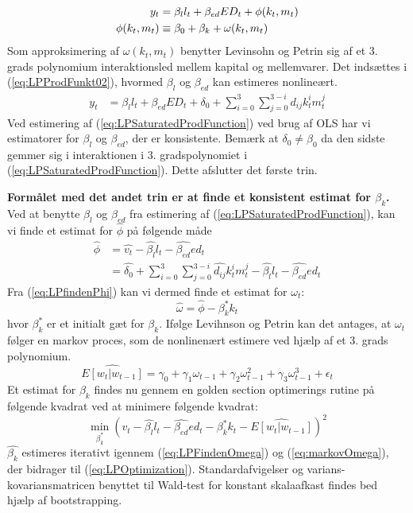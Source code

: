 \begin{align}
	y_t &= \beta_l l_t + \beta_{ed} ED_t + \phi ( k_t , m_t)
	\label{eq:LPProdFunkt02}\\
	\phi ( k_t , m_t) &\equiv \beta_0 + \beta_k + \omega (k_t , m_t) \notag
\end{align}
Som approksimering af $\omega ( k_t , m_t)$ benytter Levinsohn og Petrin sig af et 3. grads polynomium interaktionsled mellem kapital og mellemvarer. Det indsættes i (\ref{eq:LPProdFunkt02}), hvormed $\beta_l$ og $\beta_{ed}$ kan estimeres nonlineært.
\begin{align}
	y_t &= \beta_l l_t + \beta_{ed} ED_t + \delta_0 + \sum_{i=0}^{3} \sum_{j=0}^{3-i} d_{ij} k_t^i m_t^j 
	\label{eq:LPSaturatedProdFunction}
\end{align}
Ved estimering af (\ref{eq:LPSaturatedProdFunction}) ved brug af OLS har vi estimatorer for $\beta_l$ og $\beta_{ed}$, der er konsistente. Bemærk at $\delta_0 \neq \beta_0$ da den sidste gemmer sig i interaktionen i 3. gradspolynomiet i (\ref{eq:LPSaturatedProdFunction}). Dette afslutter det første trin.

\textbf{Formålet med det andet trin er at finde et konsistent estimat for $\beta_k$.} 
Ved at benytte $\beta_l$ og $\beta_{ed}$ fra estimering af (\ref{eq:LPSaturatedProdFunction}), kan vi finde et estimat for $\hat{\phi}$ på følgende måde
\begin{align}
	\hat{\phi} &= \hat{v_t} - \hat{\beta_l} l_t - \hat{\beta_{ed}} ed_t \\
	&= \hat{\delta_0} + \sum_{i=0}^{3} \sum_{j=0}^{3-i} \hat{d_{ij}} k_t^i m_t^j - \hat{\beta_l} l_t - \hat{\beta_{ed}} ed_t 
	\label{eq:LPfindenPhi}
\end{align}
Fra (\ref{eq:LPfindenPhi}) kan vi dermed finde et estimat for $\omega_t$:
\begin{equation}
	\hat{\omega} = \hat{\phi} - \beta^*_k k_t
	\label{eq:LPFindenOmega}
\end{equation}
hvor $\beta_k^*$ er et initialt gæt for $\beta_k$. Ifølge Levihnson og Petrin kan det antages, at $\omega_t$ følger en markov proces, som de nonlinenært estimere ved hjælp af et 3. grads polynomium.
\begin{equation}
 	\hat{E[w_t | w_{t-1}]} = \gamma_0 + \gamma_1 \omega_{t-1} + \gamma_2 \omega^2_{t-1} + \gamma_3 \omega^3_{t-1} + \epsilon_t
 	\label{eq:markovOmega}
 \end{equation} 
Et estimat for $\beta_k$ findes nu gennem en golden section optimerings rutine på følgende kvadrat ved at minimere følgende kvadrat:
\begin{equation}
	\min_{\beta^*_k} 
	\left( 
		v_t - \hat{\beta_l} l_t - \hat{\beta_{ed}} ed_t 
		- \beta^*_k k_t - \hat{E[w_t | w_{t-1}]} 
	\right)^2
	\label{eq:LPOptimization}
\end{equation}
$\hat{\beta_k}$ estimeres iterativt igennem (\ref{eq:LPFindenOmega}) og (\ref{eq:markovOmega}), der bidrager til (\ref{eq:LPOptimization}). Standardafvigelser og varians-kovariansmatricen benyttet til Wald-test for konstant skalaafkast findes bed hjælp af bootstrapping.

